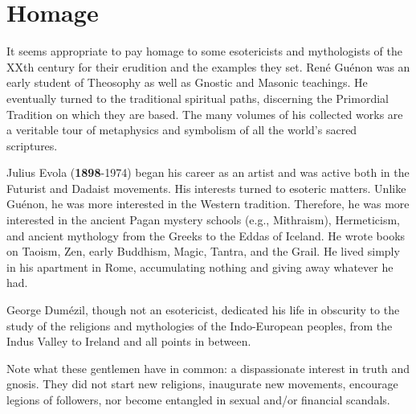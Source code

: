 \section{Homage}

It seems appropriate to pay homage to some esotericists and mythologists of the XXth century for their erudition and the examples they set. René Guénon was an early student of Theosophy as well as Gnostic and Masonic teachings. He eventually turned to the traditional spiritual paths, discerning the Primordial Tradition on which they are based. The many volumes of his collected works are a veritable tour of metaphysics and symbolism of all the world's sacred scriptures. 

Julius Evola (\textbf{1898}-1974) began his career as an artist and was active both in the Futurist and Dadaist movements. His interests turned to esoteric matters. Unlike Guénon, he was more interested in the Western tradition. Therefore, he was more interested in the ancient Pagan mystery schools (e.g., Mithraism), Hermeticism, and ancient mythology from the Greeks to the Eddas of Iceland. He wrote books on Taoism, Zen, early Buddhism, Magic, Tantra, and the Grail. He lived simply in his apartment in Rome, accumulating nothing and giving away whatever he had. 

George Dumézil, though not an esotericist, dedicated his life in obscurity to the study of the religions and mythologies of the Indo-European peoples, from the Indus Valley to Ireland and all points in between.

Note what these gentlemen have in common: a dispassionate interest in truth and gnosis. They did not start new religions, inaugurate new movements, encourage legions of followers, nor become entangled in sexual and/or financial scandals.


